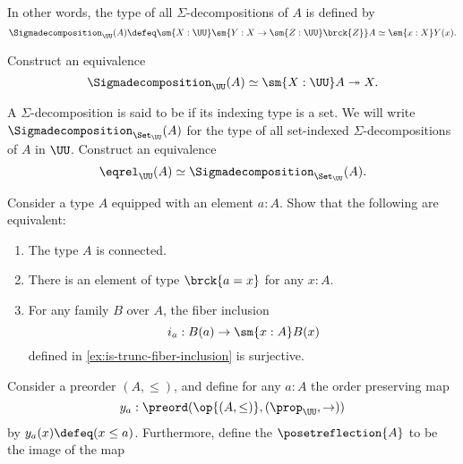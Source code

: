 \begin{exercises}
  In other words, the type of all $\Sigma$-decompositions of $A$ is defined by
  \begin{equation*}
    \Sigmadecomposition_\UU(A) \defeq \sm{X:\UU}\sm{Y:X\to\sm{Z:\UU}\brck{Z}}A\simeq\sm{x:X}Y(x).
  \end{equation*}
  \begin{subexenum}
  \item Construct an equivalence
    \begin{equation*}
      \Sigmadecomposition_\UU(A)\simeq \sm{X:\UU}A\twoheadrightarrow X.
    \end{equation*}
  \item A $\Sigma$-decomposition is said to be  if its indexing type is a set. We will write $\Sigmadecomposition_{\Set_\UU}(A)$ for the type of all set-indexed $\Sigma$-decompositions of $A$ in $\UU$. Construct an equivalence
    \begin{equation*}
      \eqrel_\UU(A)\simeq \Sigmadecomposition_{\Set_\UU}(A).
    \end{equation*}
  \end{subexenum}
  \exitem \label{ex:is-surjective-fiber-inclusion}Consider a type $A$ equipped with an element $a:A$. Show that the following are equivalent:
  \begin{enumerate}
  \item The type $A$ is connected.
  \item There is an element of type $\brck{a=x}$ for any $x:A$.
  \item For any family $B$ over $A$, the fiber inclusion
    \begin{equation*}
      i_a:B(a)\to\sm{x:A}B(x)
    \end{equation*}
    defined in \cref{ex:is-trunc-fiber-inclusion} is surjective.
  \end{enumerate}
  \exitem \label{ex:poset-reflection}Consider a preorder $(A,\leq)$, and define for any $a:A$ the order preserving map
  \begin{equation*}
    y_a : \preord(\op{(A,\leq)},{(\prop_\UU,{\to})})
  \end{equation*}
  by $y_a(x)\defeq(x\leq a)$. Furthermore, define the  $\posetreflection{A}$ to be the image of the map

\end{exercises}

